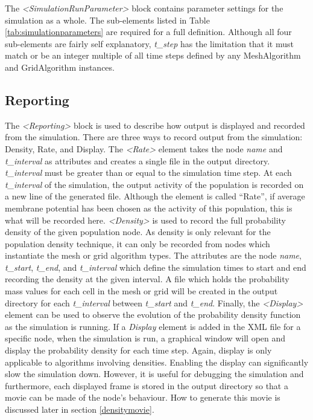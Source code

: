 \documentclass[utf8]{frontiersSCNS} %
\begin{document}
The \textit{\textless SimulationRunParameter\textgreater} block contains parameter settings for the simulation as a whole. The sub-elements listed in Table \ref{tab:simulationparameters} are required for a full definition. Although all four sub-elements are fairly self explanatory, \textit{t\_step} has the limitation that it must match or be an integer multiple of all time steps defined by any MeshAlgorithm and GridAlgorithm instances. \\

\subsection{Reporting}

The \textit{\textless Reporting\textgreater} block is used to describe how output is displayed and recorded from the simulation. There are three ways to record output from the simulation: Density, Rate, and Display. The \textit{\textless Rate\textgreater} element takes the node \textit{name} and \textit{t\_interval} as attributes and creates a single file in the output directory. \textit{t\_interval} must be greater than or equal to the simulation time step. At each \textit{t\_interval} of the simulation, the output activity of the population is recorded on a new line of the generated file. Although the element is called ``Rate'', if average membrane potential has been chosen as the activity of this population, this is what will be recorded here. \textit{\textless Density\textgreater} is used to record the full probability density of the given population node. As density is only relevant for the population density technique, it can only be recorded from nodes which instantiate the mesh or grid algorithm types. The attributes are the node \textit{name}, \textit{t\_start}, \textit{t\_end}, and \textit{t\_interval} which define the simulation times to start and end recording the density at the given interval. A file which holds the probability mass values for each cell in the mesh or grid will be created in the output directory for each \textit{t\_interval} between \textit{t\_start} and \textit{t\_end}. Finally, the \textit{\textless Display\textgreater} element can be used to observe the evolution of the probability density function as the simulation is running. If a \textit{Display} element is added in the XML file for a specific node, when the simulation is run, a graphical window will open and display the probability density for each time step. Again, display is only applicable to algorithms involving densities. Enabling the display can significantly slow the simulation down. However, it is useful for debugging the simulation and furthermore, each displayed frame is stored in the output directory so that a movie can be made of the node’s behaviour. How to generate this movie is discussed later in section \ref{densitymovie}.
\end{document}
